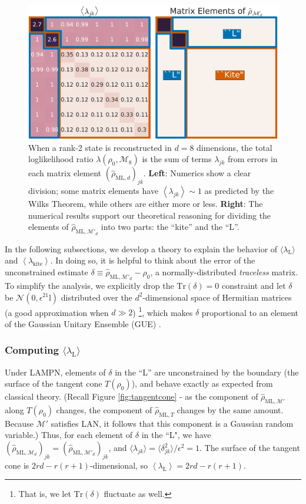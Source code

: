 \documentclass[aps,pra, twocolumn]{revtex4-1}
\newcommand{\M}{\mathcal{M}}
\newcommand{\Tr}{\mathrm{Tr}}
\newcommand{\Id}{\mathbb{I}}
\newcommand{\expect}[1]{\ensuremath{\left\langle#1\right\rangle}}
\def\Id{1\!\mathrm{l}}
\newcommand{\rhohat}{\hat{\rho}}
\newcommand{\rhoML}[1]{\rhohat_{\scriptscriptstyle{\mathrm{ML},#1}}}
\begin{document}
\begin{figure}[h]
\includegraphics[width=\columnwidth]{Images/Figure_3.pdf}
 \caption{When a rank-2 state is reconstructed in $d=8$ dimensions, the total loglikelihood ratio $\lambda(\rho_0,\mathcal{M}_8)$ is the sum of terms $\lambda_{jk}$ from errors in each matrix element $(\rhoML{d})_{jk}$.  \textbf{Left}:  Numerics show a clear division; some matrix elements have $\expect{\lambda_{jk}}\sim1$ as predicted by the Wilks Theorem, while others are either more or less. \textbf{Right}:  The numerical results support our theoretical reasoning for dividing the elements of $\rhoML{\M'_{d}}$ into two parts: the ``kite'' and the ``L''.}
\label{fig:L}
\end{figure}

In the following subsections, we develop a theory to explain the behavior of $\langle \lambda_{\mathrm{L}}\rangle$ and \expect{\lambda_{\mathrm{kite}}}.
In doing so, it is helpful to think about the error of the unconstrained estimate $\delta \equiv \rhoML{\M'_{d}}- \rho_{0}$, a normally-distributed \emph{traceless} matrix.  To simplify the analysis, we explicitly drop the $\Tr(\delta)=0$ constraint and let $\delta$ be $\mathcal{N}(0,\epsilon^2\Id)$ distributed over the $d^2$-dimensional space of Hermitian matrices (a good approximation when $d\gg2$) \footnote{That is, we let $\mathrm{Tr}(\delta)$ fluctuate as well.}, which makes $\delta$ proportional to an element of the Gaussian Unitary Ensemble (GUE) \cite{Fyodorov2005}.

\subsubsection{Computing $\langle \lambda_\mathrm{L}\rangle$}

Under LAMPN, elements of $\delta$ in the ``L'' are unconstrained by the boundary (the surface of the tangent cone $T(\rho_{0})$), and behave exactly as expected from classical theory. (Recall Figure \ref{fig:tangentcone} - as the component of $\rhoML{\M'}$ along $T(\rho_{0})$ changes, the component of $\rhoML{T}$ changes by the same amount. Because $\M'$ satisfies LAN, it follows that this component is a Gaussian random variable.) Thus, for each element of $\delta$ in the ``L", we have $(\rhoML{\M_{d}})_{jk} = (\rhoML{\M'_{d}})_{jk}$, and $\langle \lambda_{jk} \rangle = \langle \delta_{jk}^{2}\rangle /\epsilon^{2} = 1$. The surface of the tangent cone is $2rd - r(r+1)$-dimensional, so $\expect{\lambda_{\mathrm{L}}} = 2rd - r(r+1)$. 
\end{document}
